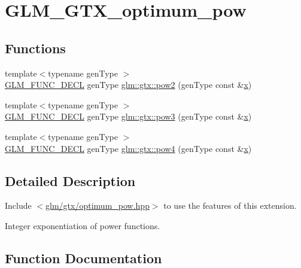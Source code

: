 \hypertarget{group__gtx__optimum__pow}{}\section{G\+L\+M\+\_\+\+G\+T\+X\+\_\+optimum\+\_\+pow}
\label{group__gtx__optimum__pow}
\subsection*{Functions}
\begin{DoxyCompactItemize}
\item 
{\footnotesize template$<$typename gen\+Type $>$ }\\\hyperlink{setup_8hpp_ab2d052de21a70539923e9bcbf6e83a51}{G\+L\+M\+\_\+\+F\+U\+N\+C\+\_\+\+D\+E\+CL} gen\+Type \hyperlink{group__gtx__optimum__pow_ga19aaff3213bf23bdec3ef124ace237e9}{glm\+::gtx\+::pow2} (gen\+Type const \&\hyperlink{_s_d_l__opengl_8h_ad0e63d0edcdbd3d79554076bf309fd47}{x})
\item 
{\footnotesize template$<$typename gen\+Type $>$ }\\\hyperlink{setup_8hpp_ab2d052de21a70539923e9bcbf6e83a51}{G\+L\+M\+\_\+\+F\+U\+N\+C\+\_\+\+D\+E\+CL} gen\+Type \hyperlink{group__gtx__optimum__pow_ga35689d03cd434d6ea819f1942d3bf82e}{glm\+::gtx\+::pow3} (gen\+Type const \&\hyperlink{_s_d_l__opengl_8h_ad0e63d0edcdbd3d79554076bf309fd47}{x})
\item 
{\footnotesize template$<$typename gen\+Type $>$ }\\\hyperlink{setup_8hpp_ab2d052de21a70539923e9bcbf6e83a51}{G\+L\+M\+\_\+\+F\+U\+N\+C\+\_\+\+D\+E\+CL} gen\+Type \hyperlink{group__gtx__optimum__pow_gacef0968763026e180e53e735007dbf5a}{glm\+::gtx\+::pow4} (gen\+Type const \&\hyperlink{_s_d_l__opengl_8h_ad0e63d0edcdbd3d79554076bf309fd47}{x})
\end{DoxyCompactItemize}


\subsection{Detailed Description}
Include $<$\hyperlink{optimum__pow_8hpp}{glm/gtx/optimum\+\_\+pow.\+hpp}$>$ to use the features of this extension.

Integer exponentiation of power functions. 

\subsection{Function Documentation}
\mbox{\label{group__gtx__optimum__pow_ga19aaff3213bf23bdec3ef124ace237e9}} 
